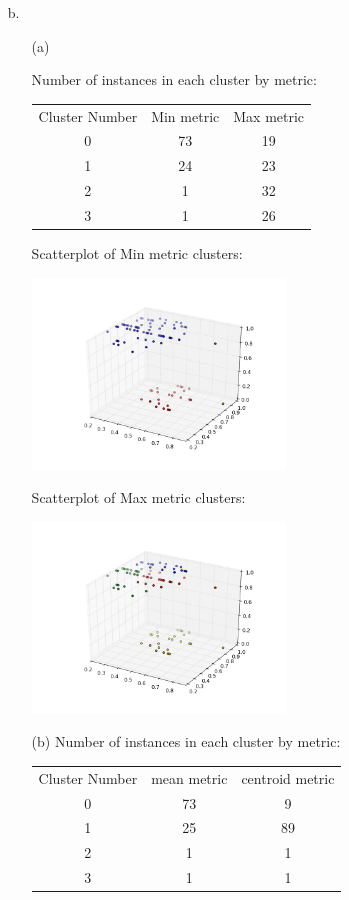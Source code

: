 \documentclass[12pt]{amsart}
\theoremstyle{remark}
\begin{document}
\begin{enumerate}
\begin{enumerate}
\begin{enumerate}
 \item[b.]
\begin{enumerate}
\item[(a)]

Number of instances in each cluster by metric:

 \begin{tabular}{ccc}
  Cluster Number&Min metric &Max metric\\
 0&73&19\\
 1&24&23\\
 2&1&32\\
 3&1&26\\
 \end{tabular}

Scatterplot of Min metric clusters:

\includegraphics[height=2in]{scatter_metric0.png}

Scatterplot of Max metric clusters:

\includegraphics[height=2in]{scatter_metric1.png}

\item[(b)]
Number of instances in each cluster by metric:

 \begin{tabular}{ccc}
  Cluster Number&mean metric &centroid metric\\
 0&73&9\\
 1&25&89\\
 2&1&1\\
 3&1&1\\
 \end{tabular}


\end{enumerate}
\end{enumerate}
\end{enumerate}
\end{enumerate}
\end{document}
